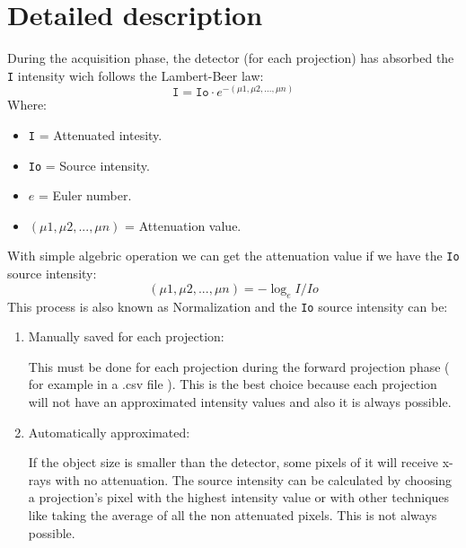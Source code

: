 \documentclass[a4paper,11pt, oneside]{article}
\begin{document}
    \section{ Detailed description }
    During the acquisition phase, the detector (for each projection) has absorbed the \texttt{I} intensity wich
    follows the Lambert-Beer law:    
    \begin{equation}
    \texttt{I} = \texttt{Io} \cdot e^{- (\mu1, \mu2, ... ,\mu n) }
    \end{equation}
    Where:
    \begin{itemize}
      \item \texttt{I} = Attenuated intesity.
      \item \texttt{Io} = Source intensity.
      \item \texttt{$ e $} = Euler number.
      \item \texttt{$ (\mu1, \mu2, ... ,\mu n) $} = Attenuation value.
    \end{itemize}
    With simple algebric operation we can get the attenuation value if we have the \texttt{Io} source intensity:
    \begin{equation}
    (\mu1, \mu2, ... ,\mu n) = - \log_e{I/Io}
    \end{equation}
    This process is also known as Normalization and the \texttt{Io} source intensity can be:
    \begin{enumerate}
      \item Manually saved for each projection:
      \par This must be done for each projection during the forward projection phase ( for example in a .csv file ). This is the best choice because each projection will not have an approximated intensity values and also it is always possible.
      
      \item Automatically approximated:
      \par If the object size is smaller than the detector, some pixels of it will receive x-rays with no attenuation. The source intensity can be calculated by choosing a projection's pixel with the highest intensity value or with other techniques like taking the average of all the non attenuated pixels. This is not always possible.
    \end{enumerate}
 
\end{document}
